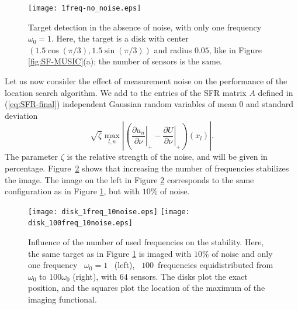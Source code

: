 \documentclass[final]{siamltex}
\numberwithin{equation}{section}
\numberwithin{figure}{section}
\numberwithin{table}{section}
\begin{document}
\begin{figure}[!h]
\centering
\texttt{[image: 1freq-no\_noise.eps]}
\caption{\label{fig:no-noise}Target detection in the absence of
noise, with only one frequency $\omega_0=1$. Here, the target is a
disk with center $(1.5\cos(\pi/3),1.5\sin(\pi/3))$ and radius
$0.05$, like in Figure \ref{fig:SF-MUSIC}(a); the number of
sensors is the same.}

\end{figure}


Let us now consider the effect of measurement noise on the
performance of the location search algorithm. We add to the
entries of the SFR matrix $A$ defined in (\ref{eq:SFR-final})
independent Gaussian random variables of mean $0$ and standard
deviation
\[
\sqrt{\zeta}\max_{l,n}\left|\left(\left.\frac{\partial
u_{n}}{\partial\nu}\right|_{+}-\left.\frac{\partial
U}{\partial\nu}\right|_{+}\right)(x_{l})\right|.
\]
The parameter $\zeta$ is the relative strength of the noise, and
will be given in percentage.
Figure~\ref{fig:noise-freq_qualitative} shows that increasing the
number of frequencies stabilizes the image. The image on the left
in Figure \ref{fig:noise-freq_qualitative} corresponds to the same
configuration as in Figure \ref{fig:no-noise}, but with $10\%$ of
noise.

\begin{figure}
\centering%
\texttt{[image: disk\_1freq\_10noise.eps]} \hspace{0.2cm}
\texttt{[image: disk\_100freq\_10noise.eps]}\tabularnewline
\caption{ \label{fig:noise-freq_qualitative}Influence of the
number of used frequencies on the stability. Here, the same target
as in Figure \ref{fig:no-noise} is imaged with $10\%$ of noise and
only one frequency ~$\omega_0=1$~ (left), ~$100$~frequencies
equidistributed from $\omega_0$ to $100 \omega_0$ (right), with
$64$ sensors. The disks plot the exact position, and the squares
plot the location of the maximum of the imaging functional.}
\end{figure}
\end{document}
